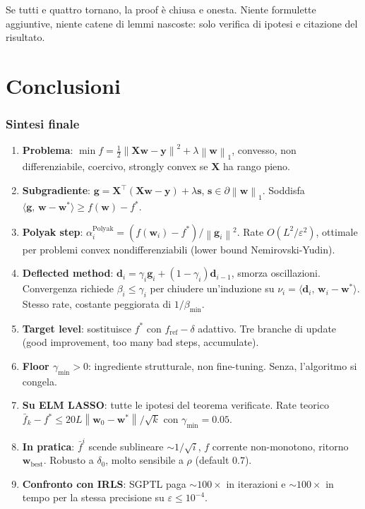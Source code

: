 \documentclass[11pt,a4paper]{article}
\newcommand{\norm}[1]{\left\|#1\right\|}
\newcommand{\inner}[2]{\langle #1,\,#2\rangle}
\newcommand{\bw}{\mathbf{w}}
\newcommand{\bg}{\mathbf{g}}
\newcommand{\bd}{\mathbf{d}}
\newcommand{\by}{\mathbf{y}}
\newcommand{\bX}{\mathbf{X}}
\newcommand{\bs}{\mathbf{s}}
\theoremstyle{definition}
\begin{document}
Se tutti e quattro tornano, la proof è chiusa e onesta. Niente formulette aggiuntive, niente catene di lemmi nascoste: solo verifica di ipotesi e citazione del risultato.

\part{Conclusioni}

\section{Sintesi finale}
\label{sec:summary}

\begin{enumerate}[leftmargin=*]
\item \textbf{Problema}: $\min f = \tfrac{1}{2}\norm{\bX\bw-\by}^2 + \lambda\norm{\bw}_1$, convesso, non differenziabile, coercivo, strongly convex se $\bX$ ha rango pieno.
\item \textbf{Subgradiente}: $\bg = \bX^\top(\bX\bw-\by) + \lambda\bs$, $\bs\in\partial\norm{\bw}_1$. Soddisfa $\inner{\bg}{\bw-\bw^*}\ge f(\bw)-f^*$.
\item \textbf{Polyak step}: $\alpha_i^{\text{Polyak}}=(f(\bw_i)-f^*)/\norm{\bg_i}^2$. Rate $O(L^2/\varepsilon^2)$, ottimale per problemi convex nondifferenziabili (lower bound Nemirovski-Yudin).
\item \textbf{Deflected method}: $\bd_i=\gamma_i\bg_i+(1-\gamma_i)\bd_{i-1}$, smorza oscillazioni. Convergenza richiede $\beta_i\le\gamma_i$ per chiudere un'induzione su $\nu_i=\inner{\bd_i}{\bw_i-\bw^*}$. Stesso rate, costante peggiorata di $1/\beta_{\min}$.
\item \textbf{Target level}: sostituisce $f^*$ con $f_{\mathrm{ref}}-\delta$ adattivo. Tre branche di update (good improvement, too many bad steps, accumulate).
\item \textbf{Floor $\gamma_{\min}>0$}: ingrediente strutturale, non fine-tuning. Senza, l'algoritmo si congela.
\item \textbf{Su ELM LASSO}: tutte le ipotesi del teorema verificate. Rate teorico $\bar f_k-f^*\le 20L\norm{\bw_0-\bw^*}/\sqrt{k}$ con $\gamma_{\min}=0.05$.
\item \textbf{In pratica}: $\bar f^i$ scende sublineare $\sim 1/\sqrt{i}$, $f$ corrente non-monotono, ritorno $\bw_{\text{best}}$. Robusto a $\delta_0$, molto sensibile a $\rho$ (default $0.7$).
\item \textbf{Confronto con IRLS}: SGPTL paga $\sim 100\times$ in iterazioni e $\sim 100\times$ in tempo per la stessa precisione su $\varepsilon\le 10^{-4}$.
\end{enumerate}
\end{document}
